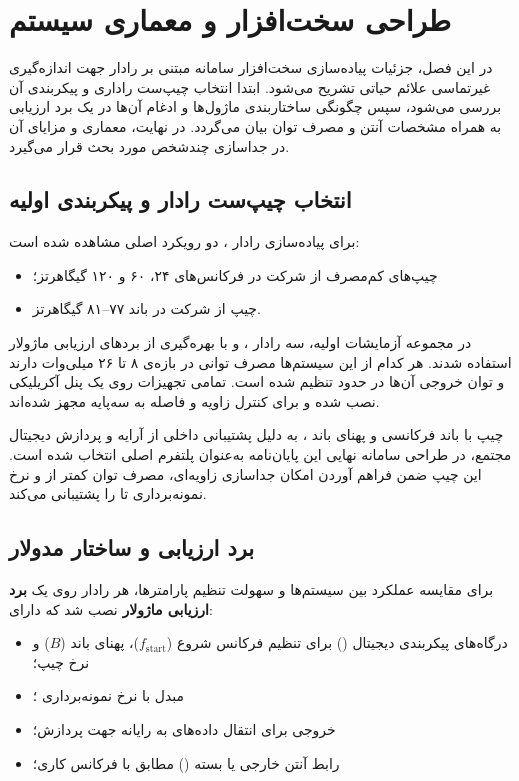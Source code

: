 \section{طراحی سخت‌افزار و معماری سیستم}

در این فصل، جزئیات پیاده‌سازی سخت‌افزار سامانه مبتنی بر رادار  جهت اندازه‌گیری غیرتماسی علائم حیاتی تشریح می‌شود. ابتدا انتخاب چیپ‌ست راداری و پیکربندی آن بررسی می‌شود، سپس چگونگی ساختاربندی ماژول‌ها و ادغام آن‌ها در یک برد ارزیابی به همراه مشخصات آنتن و مصرف توان بیان می‌گردد. در نهایت، معماری  و مزایای آن در جداسازی چندشخص مورد بحث قرار می‌گیرد.

\subsection{انتخاب چیپ‌ست رادار و پیکربندی اولیه}

برای پیاده‌سازی رادار ، دو رویکرد اصلی مشاهده شده است:

\begin{itemize}
  \item چیپ‌های کم‌مصرف  از شرکت  در فرکانس‌های ۲۴، ۶۰ و ۱۲۰ گیگاهرتز؛
  \item چیپ  از شرکت  در باند ۷۷–۸۱ گیگاهرتز.
\end{itemize}
در مجموعه آزمایشات اولیه، سه رادار ،  و  با بهره‌گیری از بردهای ارزیابی ماژولار استفاده شدند. هر کدام از این سیستم‌ها مصرف توانی در بازه‌ی ۸ تا ۲۶ میلی‌وات دارند و توان خروجی آن‌ها در حدود  تنظیم شده است. تمامی تجهیزات روی یک پنل آکریلیکی نصب شده و برای کنترل زاویه و فاصله به سه‌پایه مجهز شده‌اند.

چیپ  با باند فرکانسی  و پهنای باند ، به دلیل پشتیبانی داخلی از آرایه  و پردازش دیجیتال مجتمع، در طراحی سامانه نهایی این پایان‌نامه به‌عنوان پلتفرم اصلی انتخاب شده است. این چیپ ضمن فراهم آوردن امکان جداسازی زاویه‌ای، مصرف توان کمتر از  و نرخ نمونه‌برداری تا  را پشتیبانی می‌کند.

\subsection{برد ارزیابی و ساختار مدولار}
\label{sec:eval-board-structure}

برای مقایسه عملکرد بین سیستم‌ها و سهولت تنظیم پارامترها، هر رادار روی یک \textbf{برد ارزیابی ماژولار} نصب شد که دارای:

\begin{itemize}
  \item درگاه‌های پیکربندی دیجیتال () برای تنظیم فرکانس شروع ($f_\text{start}$)، پهنای باند ($B$) و نرخ چیپ؛
  \item مبدل  با نرخ نمونه‌برداری ؛
  \item خروجی  برای انتقال داده‌های  به رایانه جهت پردازش؛
  \item رابط آنتن خارجی یا بسته () مطابق با فرکانس کاری؛
\end{itemize}

